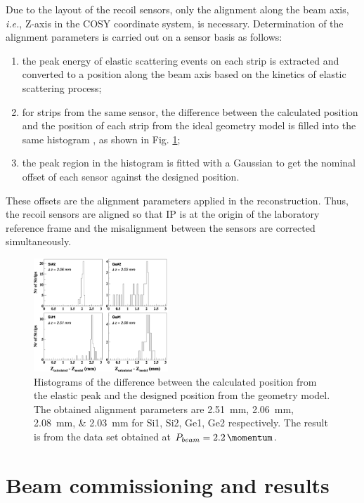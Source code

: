 \documentclass[number,5p]{elsarticle}
\begin{document}
Due to the layout of the recoil sensors, only the alignment along
the beam axis, \textit{i.e.}, Z-axis in the COSY coordinate system, is necessary.
Determination of the alignment parameters is carried out on a sensor basis as follows:
\begin{enumerate}
\item the peak energy of elastic scattering events on each strip is extracted and
  converted to a position along the beam axis based on the kinetics of elastic scattering process;
\item for strips from the same sensor, the difference between the calculated
  position and the position of each strip from the ideal geometry model is filled into the same histogram , as shown in Fig. \ref{fig:alignment};
\item the peak region in the histogram is fitted with a Gaussian to get the
  nominal offset of each sensor against the designed position.
\end{enumerate}
These offsets are the alignment parameters applied in the reconstruction.
Thus, the recoil sensors are aligned so that IP is at the origin of the
laboratory reference frame and the misalignment between the sensors are corrected simultaneously.
\begin{figure}[h!]
  \centering
  \includegraphics[width=0.45\textwidth]{./alignment.png}
  \caption{Histograms of the difference between the calculated position from the
    elastic peak and the designed position from the geometry model.
    The obtained alignment parameters are
    \SIlist[list-units=single]{2.51;2.06;2.08;2.03}{\mm} for Si1, Si2, Ge1, Ge2 respectively.
    The result is from the data set obtained at $P_{beam} =
    \SI{2.2}{\momentum}$.}
  \label{fig:alignment}
\end{figure}

\section{Beam commissioning and results}
\label{sec:result}
\end{document}

